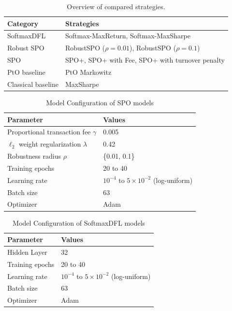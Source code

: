 \documentclass[review]{elsarticle}
\begin{document}
\begin{table}[H]
\centering
\caption{Overview of compared strategies.}
\label{tab:strategy_mapping}
\begin{tabular}{ll}
\toprule
\textbf{Category} & \textbf{Strategies} \\
\midrule
SoftmaxDFL
& Softmax-MaxReturn, Softmax-MaxSharpe \\

Robust SPO
& RobustSPO ($\rho=0.01$), RobustSPO ($\rho=0.1$) \\

SPO
& SPO+, SPO+ with Fee, SPO+ with turnover penalty \\

PtO baseline
& PtO Markowitz \\

Classical baseline
& MaxSharpe \\
\bottomrule
\end{tabular}
\end{table}

\begin{table}[H]
\centering
\caption{Model Configuration of SPO models}
\label{tab:SPO_params}
\begin{tabular}{ll}
\hline
\textbf{Parameter} & \textbf{Values} \\
\hline
Proportional transaction fee $\gamma$      & 0.005 \\
$\ell_2$ weight regularization $\lambda$        & 0.42 \\
Robustness radius $\rho$                    & \{0.01, 0.1\} \\
Training epochs                             & 20 to 40 \\
Learning rate                               & $10^{-4}$ to $5\times10^{-2}$ (log-uniform) \\
Batch size                                 & 63 \\
Optimizer                                  & Adam \\
\hline
\end{tabular}
\end{table}

\begin{table}[H]
\centering
\caption{Model Configuration of SoftmaxDFL models}
\label{tab:Softmax_params}
\begin{tabular}{ll}
\hline
\textbf{Parameter} & \textbf{Values} \\
\hline
Hidden Layer                                & 32 \\
Training epochs                             & 20 to 40 \\
Learning rate                               & $10^{-4}$ to $5\times10^{-2}$ (log-uniform) \\
Batch size                                 & 63 \\
Optimizer                                  & Adam \\
\hline
\end{tabular}
\end{table}
\end{document}
